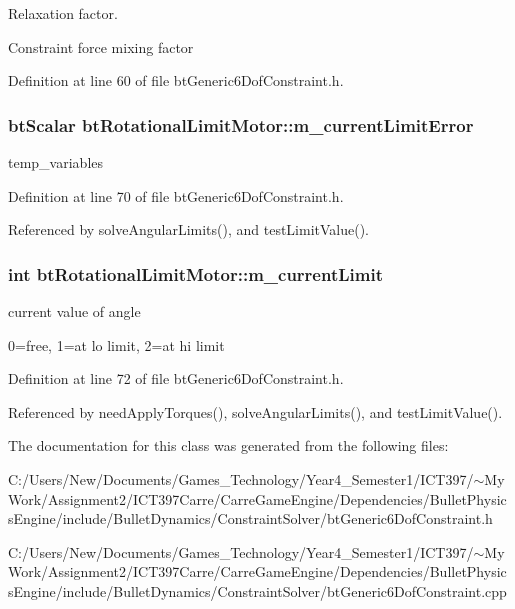 Relaxation factor. 

Constraint force mixing factor 

Definition at line 60 of file btGeneric6DofConstraint.h.\hypertarget{classbt_rotational_limit_motor_7128feccb391176842f287b584e375d3}{
\subsubsection[m\_\-currentLimitError]{\setlength{\rightskip}{0pt plus 5cm}btScalar {\bf btRotationalLimitMotor::m\_\-currentLimitError}}}
\label{classbt_rotational_limit_motor_7128feccb391176842f287b584e375d3}


temp\_\-variables 

Definition at line 70 of file btGeneric6DofConstraint.h.

Referenced by solveAngularLimits(), and testLimitValue().\hypertarget{classbt_rotational_limit_motor_d1e4fa6cb3ea2e4b78c96feab97448e8}{
\subsubsection[m\_\-currentLimit]{\setlength{\rightskip}{0pt plus 5cm}int {\bf btRotationalLimitMotor::m\_\-currentLimit}}}
\label{classbt_rotational_limit_motor_d1e4fa6cb3ea2e4b78c96feab97448e8}


current value of angle 

0=free, 1=at lo limit, 2=at hi limit 

Definition at line 72 of file btGeneric6DofConstraint.h.

Referenced by needApplyTorques(), solveAngularLimits(), and testLimitValue().

The documentation for this class was generated from the following files:\begin{CompactItemize}
\item 
C:/Users/New/Documents/Games\_\-Technology/Year4\_\-Semester1/ICT397/$\sim$My Work/Assignment2/ICT397Carre/CarreGameEngine/Dependencies/BulletPhysicsEngine/include/BulletDynamics/ConstraintSolver/btGeneric6DofConstraint.h\item 
C:/Users/New/Documents/Games\_\-Technology/Year4\_\-Semester1/ICT397/$\sim$My Work/Assignment2/ICT397Carre/CarreGameEngine/Dependencies/BulletPhysicsEngine/include/BulletDynamics/ConstraintSolver/btGeneric6DofConstraint.cpp\end{CompactItemize}
